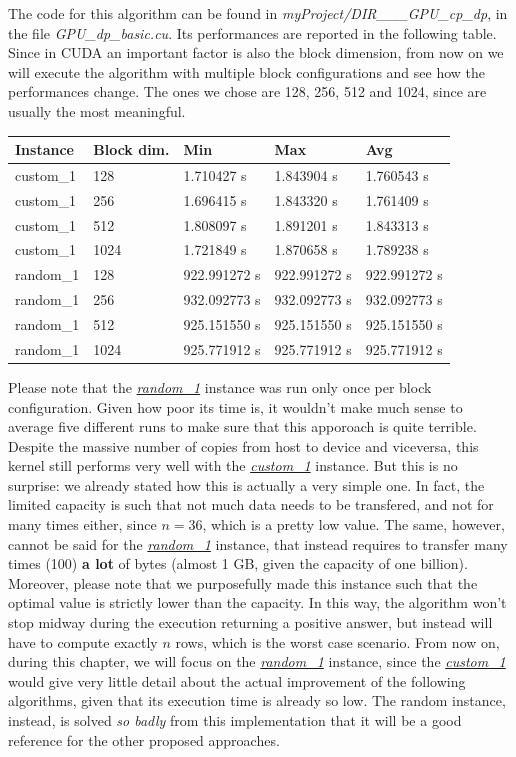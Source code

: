 \documentclass[12pt]{extarticle}
\begin{document}
The code for this algorithm can be found in \emph{myProject/DIR\_\_\_GPU\_cp\_dp}, in the file \emph{GPU\_dp\_basic.cu}.\newline
Its performances are reported in the following table. Since in CUDA an important factor is also the block dimension, from now on we will execute the algorithm with multiple block configurations and see how the performances change. The ones we chose are 128, 256, 512 and 1024, since are usually the most meaningful.
\begin{center}
\begin{tabular}{ | m{2.2cm} | m{2.2cm} | m{2.4cm} | m{2.4cm} | m{2.4cm} |}
 \hline
 Instance & Block dim. & Min & Max & Avg\\
 \hline
 custom\_1 & 128 & 1.710427 s & 1.843904 s & 1.760543 s\\
 \hline
 custom\_1 & 256 & 1.696415 s & 1.843320 s & 1.761409 s\\
 \hline
 custom\_1 & 512 & 1.808097 s & 1.891201 s & 1.843313 s\\
 \hline
 custom\_1 & 1024 & 1.721849 s & 1.870658 s & 1.789238 s\\
 \hline
 random\_1 & 128 & 922.991272 s & 922.991272 s & 922.991272 s\\
 \hline
 random\_1 & 256 & 932.092773 s & 932.092773 s & 932.092773 s\\
 \hline
 random\_1 & 512 & 925.151550 s & 925.151550 s & 925.151550 s\\
 \hline
 random\_1 & 1024 & 925.771912 s & 925.771912 s & 925.771912 s\\
 \hline
\end{tabular}
\end{center}
Please note that the \hyperref[random-1]{\emph{random\_1}} instance was run only once per block configuration. Given how poor its time is, it wouldn't make much sense to average five different runs to make sure that this apporoach is quite terrible.\newline
Despite the massive number of copies from host to device and viceversa, this kernel still performs very well with the \hyperref[custom-1]{\emph{custom\_1}} instance. But this is no surprise: we already stated how this is actually a very simple one. In fact, the limited capacity is such that not much data needs to be transfered, and not for many times either, since $n = 36$, which is a pretty low value. The same, however, cannot be said for the \hyperref[random-1]{\emph{random\_1}} instance, that instead requires to transfer many times (100) \textbf{a lot} of bytes (almost 1 GB, given the capacity of one billion). Moreover, please note that we purposefully made this instance such that the optimal value is strictly lower than the capacity. In this way, the algorithm won't stop midway during the execution returning a positive answer, but instead will have to compute exactly $n$ rows, which is the worst case scenario. From now on, during this chapter, we will focus on the \hyperref[random-1]{\emph{random\_1}} instance, since the \hyperref[custom-1]{\emph{custom\_1}} would give very little detail about the actual improvement of the following algorithms, given that its execution time is already so low. The random instance, instead, is solved \emph{so badly} from this implementation that it will be a good reference for the other proposed approaches.
\end{document}
